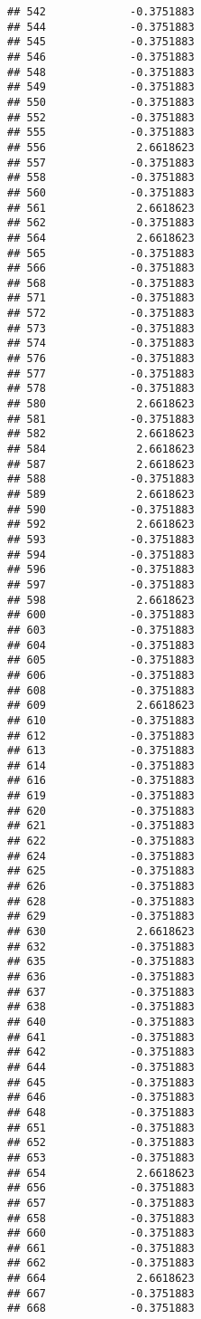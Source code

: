 \documentclass[
]{article}
\begin{document}
\begin{verbatim}
## 542             -0.3751883
## 544             -0.3751883
## 545             -0.3751883
## 546             -0.3751883
## 548             -0.3751883
## 549             -0.3751883
## 550             -0.3751883
## 552             -0.3751883
## 555             -0.3751883
## 556              2.6618623
## 557             -0.3751883
## 558             -0.3751883
## 560             -0.3751883
## 561              2.6618623
## 562             -0.3751883
## 564              2.6618623
## 565             -0.3751883
## 566             -0.3751883
## 568             -0.3751883
## 571             -0.3751883
## 572             -0.3751883
## 573             -0.3751883
## 574             -0.3751883
## 576             -0.3751883
## 577             -0.3751883
## 578             -0.3751883
## 580              2.6618623
## 581             -0.3751883
## 582              2.6618623
## 584              2.6618623
## 587              2.6618623
## 588             -0.3751883
## 589              2.6618623
## 590             -0.3751883
## 592              2.6618623
## 593             -0.3751883
## 594             -0.3751883
## 596             -0.3751883
## 597             -0.3751883
## 598              2.6618623
## 600             -0.3751883
## 603             -0.3751883
## 604             -0.3751883
## 605             -0.3751883
## 606             -0.3751883
## 608             -0.3751883
## 609              2.6618623
## 610             -0.3751883
## 612             -0.3751883
## 613             -0.3751883
## 614             -0.3751883
## 616             -0.3751883
## 619             -0.3751883
## 620             -0.3751883
## 621             -0.3751883
## 622             -0.3751883
## 624             -0.3751883
## 625             -0.3751883
## 626             -0.3751883
## 628             -0.3751883
## 629             -0.3751883
## 630              2.6618623
## 632             -0.3751883
## 635             -0.3751883
## 636             -0.3751883
## 637             -0.3751883
## 638             -0.3751883
## 640             -0.3751883
## 641             -0.3751883
## 642             -0.3751883
## 644             -0.3751883
## 645             -0.3751883
## 646             -0.3751883
## 648             -0.3751883
## 651             -0.3751883
## 652             -0.3751883
## 653             -0.3751883
## 654              2.6618623
## 656             -0.3751883
## 657             -0.3751883
## 658             -0.3751883
## 660             -0.3751883
## 661             -0.3751883
## 662             -0.3751883
## 664              2.6618623
## 667             -0.3751883
## 668             -0.3751883

\end{verbatim}
\end{document}
